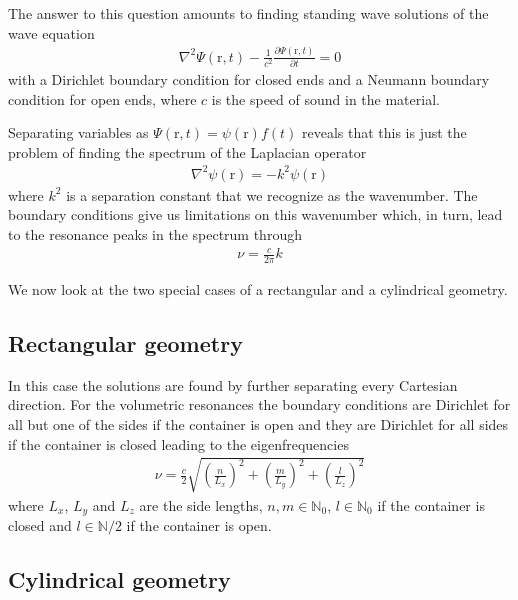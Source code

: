 \documentclass[10pt,a4paper,twocolumn]{article}
\renewcommand{\vec}[1]{\bm{\mathrm{#1}}}
\begin{document}
The answer to this question amounts to finding standing wave solutions of the wave equation
%
\begin{align}
\nabla^2 \Psi(\vec{r}, t) - \frac{1}{c^2} \frac{\partial \Psi(\vec{r}, t)}{\partial t} = 0
\end{align}
%
with a Dirichlet boundary condition for closed ends and a Neumann boundary condition for open ends, where $c$ is the speed of sound in the material.

Separating variables as $\Psi(\vec{r}, t) = \psi(\vec{r}) f(t)$ reveals that this is just the problem of finding the spectrum of the Laplacian operator
%
\begin{align}
\nabla^2 \psi(\vec{r}) = -k^2 \psi(\vec{r})
\end{align}
%
where $k^2$ is a separation constant that we recognize as the wavenumber. The boundary conditions give us limitations on this wavenumber which, in turn, lead to the resonance peaks in the spectrum through
%
\begin{align}
\nu = \frac{c}{2 \pi} k
\end{align}

We now look at the two special cases of a rectangular and a cylindrical geometry.

\subsection{Rectangular geometry}

In this case the solutions are found by further  separating every Cartesian direction. For the volumetric resonances the boundary conditions are Dirichlet for all but one of the sides if the container is open and they are Dirichlet for all sides if the container is closed leading to the eigenfrequencies
%
\begin{align}
\nu = \frac{c}{2} \sqrt{\left(\frac{n}{L_x}\right)^2 + \left(\frac{m}{L_y}\right)^2 + \left(\frac{l}{L_z}\right)^2}
\end{align}
%
where $L_x$, $L_y$ and $L_z$ are the side lengths, $n, m \in \mathbb{N}_0$, $l \in \mathbb{N}_0$ if the container is closed and $l \in \mathbb{N}/2$ if the container is open.

\subsection{Cylindrical geometry}
\end{document}
